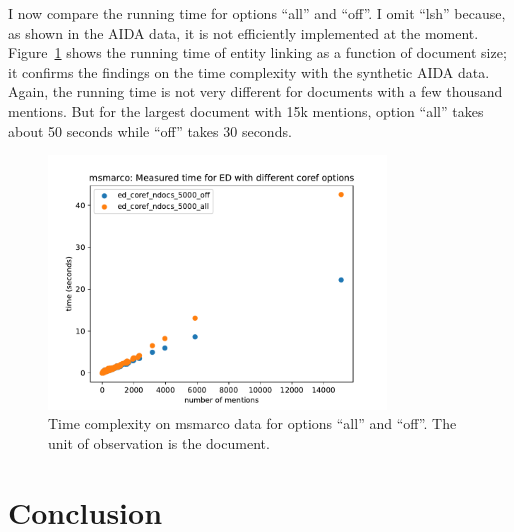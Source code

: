 \documentclass[a4paper,11pt]{article}
\numberwithin{equation}{section} %
\begin{document}
I now compare the running time for options ``all'' and ``off''. I omit ``lsh'' because, as shown in the AIDA data, it is not efficiently implemented at the moment. Figure~\ref{fig:timing_msmarco} shows the running time of entity linking as a function of document size; it confirms the findings on the time complexity with the synthetic AIDA data. Again, the running time is not very different for documents with a few thousand mentions. But for the largest document with 15k mentions, option ``all'' takes about 50 seconds while ``off'' takes 30 seconds.


\begin{figure}[H]
  \centering
  \includegraphics[width = 0.8\textwidth]{../figs/timing_msmarco.pdf}
  \caption{Time complexity on msmarco data for options ``all'' and ``off''. The unit of observation is the document.}
  \label{fig:timing_msmarco}
\end{figure}

\section{Conclusion}
\end{document}
